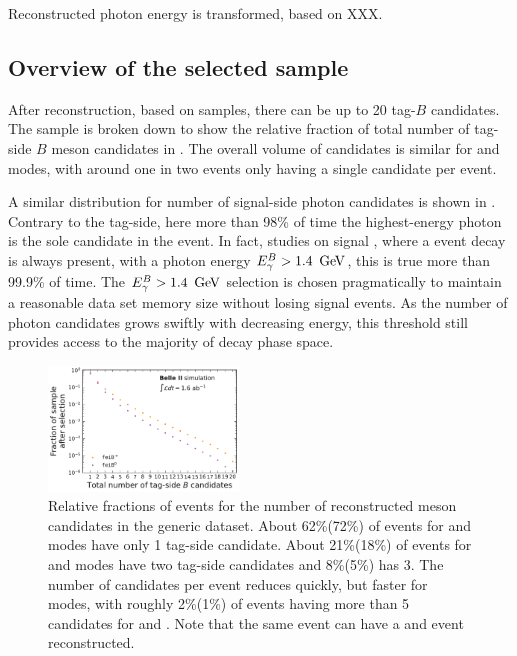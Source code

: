 Reconstructed photon energy is transformed, based on XXX.

\subsection{Overview of the selected sample}\label{sec:reconstruction_overview}

After reconstruction, based on \MC samples, there can be up to 20 tag-$B$ candidates.
The sample is broken down to show the relative fraction of total number of tag-side $B$ meson candidates in .
The overall volume of candidates is similar for \feiBp and \feiBz modes, with around one in two events only having a single candidate per event.

A similar distribution for number of signal-side photon candidates is shown in .
Contrary to the tag-side, here more than 98\% of time the highest-energy photon is the sole candidate in the event.
In fact, studies on signal \MC, where a \BtoXsgamma event decay is always present, with a photon energy ${E^B_{\gamma}}>1.4~\mathrm{\,Ge\kern -0.1em V}$, this is true more than  99.9\% of time.
The ${E^B_{\gamma}}>1.4~\mathrm{\,Ge\kern -0.1em V}$ selection is chosen pragmatically to maintain a reasonable data set memory size without losing signal events.
As the number of photon candidates grows swiftly with decreasing energy, this threshold still provides access to the majority of \BtoXsgamma decay phase space.
\begin{figure}[htbp!]
    \centering
    \includegraphics[width=0.45\textwidth]{figures/event_reconstruction/Bboth_total_tag_candidates.pdf}

    \caption{\label{fig:fei_tag_reco_candidates} Relative fractions of events for the number of reconstructed \B meson candidates in the generic \MC dataset.
    About 62\%(72\%) of events for \Bp and \Bz \FEI modes have only 1 tag-side candidate.
    About 21\%(18\%) of events for \Bp and \Bz \FEI modes have two tag-side candidates and 8\%(5\%) has 3.
    The number of candidates per event reduces quickly, but faster for \Bz modes, with roughly 2\%(1\%) of events having more than 5 candidates for \Bp and \Bz.
    Note that the same event can have a \Bp and \Bz event reconstructed.
    }
\end{figure}
